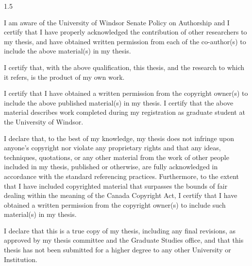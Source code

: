 \documentclass[fleqn, oneside, 12pt]{book}
\theoremstyle{definitionsty}
\newcommand{\uwinonehalfspacelen}{1.5}
\newcommand{\uwindefaultspacelen}{\uwinonehalfspacelen}
\newenvironment{uwindefaultspaceenv}%
{\begin{spacing}{\uwindefaultspacelen}}%
	{\end{spacing}}
\begin{document}
\begin{uwindefaultspaceenv}


	I am aware of the University of Windsor Senate Policy on Authorship and I certify that I have properly acknowledged the contribution of other researchers to my thesis, and have obtained written permission from each of the co-author(s) to include the above material(s) in my thesis.

	I certify that, with the above qualification, this thesis, and the research to which it refers, is the product of my own work.

	I certify that I have obtained a written permission from the copyright owner(s) to include the above
	published material(s) in my thesis. I certify that the above material describes work completed during my
	registration as graduate student at the University of Windsor.

	I declare that, to the best of my knowledge, my thesis does not infringe upon anyone's copyright nor
	violate any proprietary rights and that any ideas, techniques, quotations, or any other material from the work
	of other people included in my thesis, published or otherwise, are fully acknowledged in accordance with the
	standard referencing practices. Furthermore, to the extent that I have included copyrighted material that
	surpasses the bounds of fair dealing within the meaning of the Canada Copyright Act, I certify that I have
	obtained a written permission from the copyright owner(s) to include such material(s) in my thesis.

	I declare that this is a true copy of my thesis, including any final revisions, as approved by my thesis
	committee and the Graduate Studies office, and that this thesis has not been submitted for a higher degree to
	any other University or Institution.

\end{uwindefaultspaceenv}
\end{document}
